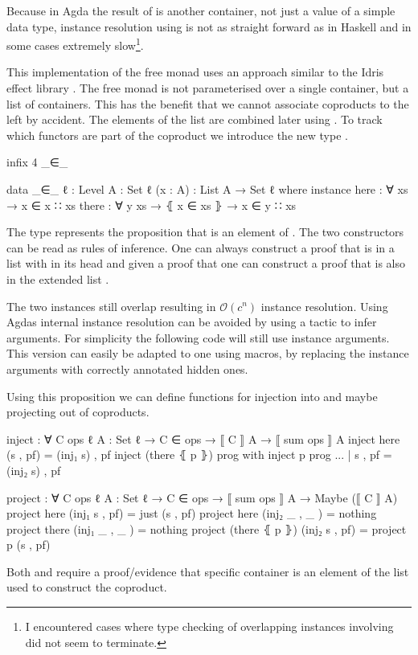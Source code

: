 Because in Agda the result of  is another container, not
just a value of a simple data type, instance resolution using
 is not as straight forward as in Haskell and in some cases
extremely slow\footnote{I encountered cases where type checking of overlapping
instances involving  did not seem to terminate.}.

This implementation of the free monad uses an approach similar to the Idris
effect library \cite{DBLP:conf/icfp/Brady13}.
The free monad is not parameterised over a single container, but a list
 of containers.
This has the benefit that we cannot associate coproducts to the left by
accident.
The elements of the list are combined later using .
To track which functors are part of the coproduct we introduce the new type
.

\begin{code}[hide]
infix 4 _∈_
\end{code}
\begin{code}
data _∈_ {ℓ : Level} {A : Set ℓ} (x : A) : List A → Set ℓ where
  instance
    here : ∀ {xs} → x ∈ x ∷ xs
    there : ∀ {y xs} → ⦃ x ∈ xs ⦄ → x ∈ y ∷ xs
\end{code}
The type
\AgdaSpace{}\AgdaSpace{}
represents the proposition that  is an element of
.
The two constructors can be read as rules of inference.
One can always construct a proof that  is in a list with
 in its head and given a proof that
\AgdaSpace{}\AgdaSpace{}
one can construct a proof that  is also in the extended list
\AgdaSpace{}\AgdaSpace{}.

The two instances still overlap resulting in $\mathcal{O}(c^n)$ instance
resolution.
Using Agdas internal instance resolution can be avoided by using a tactic to
infer  arguments.
For simplicity the following code will still use instance arguments.
This version can easily be adapted to one using macros, by replacing the
instance arguments with correctly annotated hidden ones.

Using this proposition we can define functions for injection into and maybe projecting
out of coproducts.

\begin{code}
inject : ∀ {C ops ℓ} {A : Set ℓ} → C ∈ ops → ⟦ C ⟧ A → ⟦ sum ops ⟧ A
inject here           (s , pf)  = (inj₁ s) , pf
inject (there ⦃ p ⦄)  prog      with inject p prog
... | s , pf = (inj₂ s) , pf

project : ∀ {C ops ℓ} {A : Set ℓ} → C ∈ ops → ⟦ sum ops ⟧ A → Maybe (⟦ C ⟧ A)
project here           (inj₁ s , pf)  = just (s , pf)
project here           (inj₂ _ , _ )  = nothing
project there          (inj₁ _ , _ )  = nothing
project (there ⦃ p ⦄)  (inj₂ s , pf)  = project p (s , pf)
\end{code}
Both  and  require a proof/evidence
that specific container is an element of the list used to construct the
coproduct.

